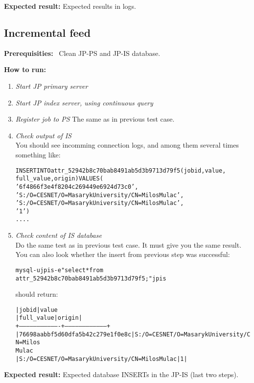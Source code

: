 \documentclass{egee}
\def\req{\noindent\textbf{Prerequisities: }}
\def\how{\noindent\textbf{How to run: }}
\def\result{\noindent\textbf{Expected result: }}
\begin{document}
\result{} Expected results in logs.


\subsection{Incremental feed}

\req\ Clean JP-PS and JP-IS database.

\how\
\begin{enumerate}
 \item \emph{Start JP primary server}
 \item \emph{Start JP index server, using continuous query}
 \item \emph{Register job to PS}
  The same as in previous test case.

 \item \emph{Check output of IS}\\
  You should see incomming connection logs, and among them
  several times something like:
  \begin{alltt}
    
   INSERT INTO attr_52942b8c70bab8491ab5d3b9713d79f5 (jobid, value,
                                        full_value, origin) VALUES (
     '6f4866f3e4f8204c269449e6924d73c0',
     'S:/O=CESNET/O=Masaryk University/CN=Milos Mulac',
     'S:/O=CESNET/O=Masaryk University/CN=Milos Mulac',
     '1')
   ....
  \end{alltt}
 \item \emph{Check content of IS database}\\
 Do the same test as in previous test case. It must give you the same
 result. You can also look whether the insert from previous step was 
 successful:
 \begin{alltt}
  mysql -u jpis -e "select * from
    attr_52942b8c70bab8491ab5d3b9713d79f5;" jpis
 \end{alltt}
  should return:
 \begin{alltt}
| jobid                            | value
| full_value                                      | origin |
+----------------------------------+-----------------------------------+
| 76698aabbf5d60dfa5b42c279e1f0e8c | S:/O=CESNET/O=Masaryk University/CN=Milos
Mulac 
| S:/O=CESNET/O=Masaryk University/CN=Milos Mulac |      1 |
 \end{alltt}
\end{enumerate}
\result{} Expected database INSERTs in the JP-IS (last two steps).
\end{document}
